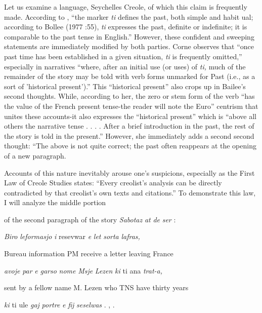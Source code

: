 Let us examine a language, Seychelles Creole, of which this claim is frequently made. According to \citet[102]{Corne1977}, ``the marker \textit{ti} defines the past, both simple and habit ual{\textquotedbl}; according to Bollee (1977 :55), \textit{{\textquotedbl}ti} expresses the past, definite or indefinite; it is comparable to the past tense in English.'' However, these confident and sweeping statements are immediately modified by both parties. Corne observes that ``once past time has been established in a given situation, \textit{ti} is frequently omitted,'' especially in narratives ``where, after an initial use (or uses) of \textit{ti,} much of the remainder of the story may be told with verb forms unmarked for Past (i.e., as a sort of 'historical present').'' This ``historical present'' also crops up in Bailee's second thoughts. While, according to her, the zero or stem form of the verb ``has the value of the French present tense{\textquotedbl}{}-the reader will note the Euro'' centrism that unites these accounts{}-it also expresses the ``historical present'' which is ``above all others the narrative tense . . . . After a brief introduction in the past, the rest of the story is told in the pres\-ent.'' However, she immediately adds a second second thought: ``The above is not quite correct; the past often reappears at the opening of a new paragraph.{\textquotedbl}

Accounts of this nature inevitably arouse one's suspicions, especially as the First Law of Creole Studies states: ``Every creolist's analysis can be directly contradicted by that creolist's own texts and citations.'' To demonstrate this law, I will analyze the middle portion

of the second paragraph of the story \textit{Sabotaz} \textit{at} \textit{de} \textit{ser} \citep[166]{Bollee1977}:


\ea\label{ex:94}
 \textit{Biro} \textit{le}\textit{formasjo} \textit{i} resevwar \textit{e} \textit{let} \textit{sorta} \textit{lafras,}
\glt
\z

Bureau information PM receive a letter leaving France

\textit{avoje} \textit{par} \textit{e} \textit{garso} \textit{nome} \textit{M}\textit{sje} \textit{Lezen} \textit{ki} ti ana \textit{trat-a,}

sent by a fellow name M. Lezen who TNS have thirty years

\textit{ki} ti ule \textit{gaj} \textit{portre} \textit{e} \textit{fij} \textit{seselwas} . , .

